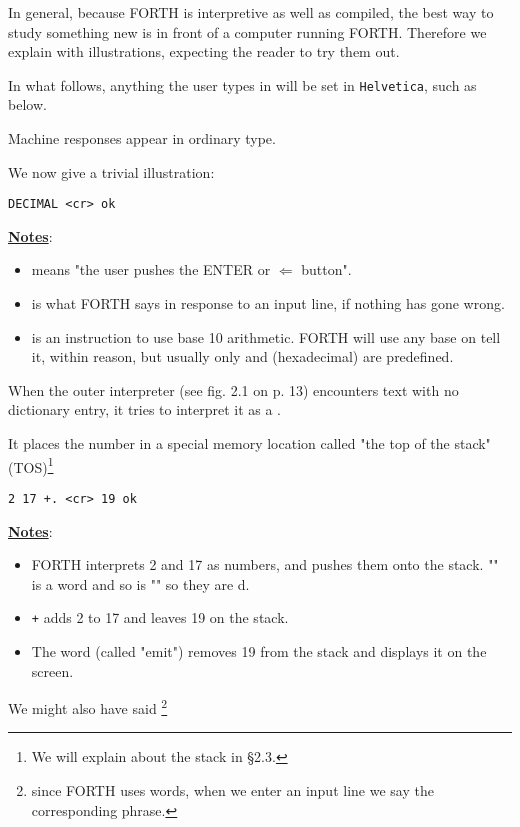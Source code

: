 In general, because FORTH is interpretive as well as compiled, the best way to study something new is in front of a computer running FORTH. Therefore we explain with illustrations, expecting the reader to try them out.

In what follows, anything the user types in will be set in \lstinline$Helvetica$, such as  below.

Machine responses appear in ordinary type.

We now give a trivial illustration:

\begin{lstlisting}
DECIMAL <cr> ok
\end{lstlisting}

\underline{\textbf{Notes}}:
\begin{itemize}
  \item {} means "the user pushes the ENTER or $\Leftarrow$ button".
  \item {} is what FORTH says in response to an input line, if nothing has gone wrong.
  \item {} is an instruction to use base 10 arithmetic. FORTH will use any base on tell it, within reason, but usually only  and  (hexadecimal) are predefined.
\end{itemize}

When the outer interpreter (see fig. 2.1 on p. 13) encounters text with no dictionary entry, it tries to interpret it as a .

It places the number in a special memory location called "the top of the stack" (TOS)\footnote{We will explain about the stack in §2.3.}
\begin{lstlisting}
2 17 +. <cr> 19 ok
\end{lstlisting}

\underline{\textbf{Notes}}:
\begin{itemize}
  \item FORTH interprets 2 and 17 as numbers, and pushes them onto the stack. "\bc{+}" is a word and so is "" so they are d.
  \item \lstinline$+$ adds 2 to 17 and leaves 19 on the stack.
  \item The word  (called "emit") removes 19 from the stack and displays it on the screen.
\end{itemize}

We might also have said \footnote{since FORTH uses words, when we enter an input line we say the corresponding phrase.}

